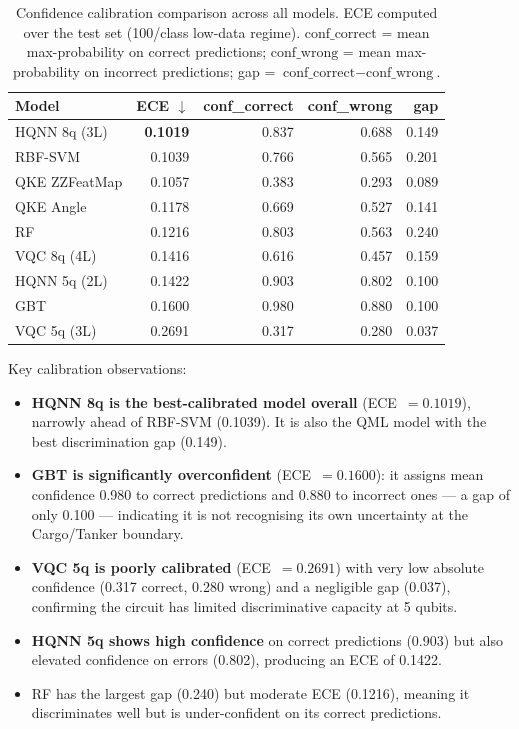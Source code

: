 \documentclass[journal]{IEEEtran}
\begin{document}
\begin{table}[H]
\centering
\caption{Confidence calibration comparison across all models.
         ECE computed over the test set (100/class low-data regime).
         $\text{conf\_correct}$ = mean max-probability on correct predictions;
         $\text{conf\_wrong}$ = mean max-probability on incorrect predictions;
         gap = $\text{conf\_correct} - \text{conf\_wrong}$.}
\begin{tabular}{lrrrr}
\toprule
\textbf{Model} & \textbf{ECE} $\downarrow$ & \textbf{conf\_correct} & \textbf{conf\_wrong} & \textbf{gap} \\
\midrule
HQNN 8q (3L)  & \textbf{0.1019} & 0.837 & 0.688 & 0.149 \\
RBF-SVM       & 0.1039 & 0.766 & 0.565 & 0.201 \\
QKE ZZFeatMap & 0.1057 & 0.383 & 0.293 & 0.089 \\
QKE Angle     & 0.1178 & 0.669 & 0.527 & 0.141 \\
RF            & 0.1216 & 0.803 & 0.563 & 0.240 \\
VQC 8q (4L)   & 0.1416 & 0.616 & 0.457 & 0.159 \\
HQNN 5q (2L)  & 0.1422 & 0.903 & 0.802 & 0.100 \\
GBT           & 0.1600 & 0.980 & 0.880 & 0.100 \\
VQC 5q (3L)   & 0.2691 & 0.317 & 0.280 & 0.037 \\
\bottomrule
\end{tabular}
\end{table}

Key calibration observations:
\begin{itemize}
  \item \textbf{HQNN 8q is the best-calibrated model overall} (ECE~$= 0.1019$),
        narrowly ahead of RBF-SVM (0.1039). It is also the QML model with
        the best discrimination gap (0.149).
  \item \textbf{GBT is significantly overconfident} (ECE~$= 0.1600$):
        it assigns mean confidence 0.980 to correct predictions and 0.880
        to incorrect ones — a gap of only 0.100 — indicating it is not
        recognising its own uncertainty at the Cargo/Tanker boundary.
  \item \textbf{VQC 5q is poorly calibrated} (ECE~$= 0.2691$) with very
        low absolute confidence (0.317 correct, 0.280 wrong) and a negligible
        gap (0.037), confirming the circuit has limited discriminative capacity
        at 5 qubits.
  \item \textbf{HQNN 5q shows high confidence} on correct predictions (0.903)
        but also elevated confidence on errors (0.802), producing an ECE of 0.1422.
  \item RF has the largest gap (0.240) but moderate ECE (0.1216), meaning
        it discriminates well but is under-confident on its correct predictions.
\end{itemize}
\end{document}
